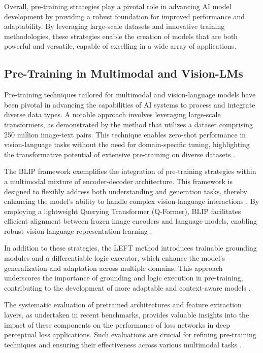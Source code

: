 Overall, pre-training strategies play a pivotal role in advancing AI model development by providing a robust foundation for improved performance and adaptability. By leveraging large-scale datasets and innovative training methodologies, these strategies enable the creation of models that are both powerful and versatile, capable of excelling in a wide array of applications.



\subsection{Pre-Training in Multimodal and Vision-LMs} \label{subsec:Pre-Training in Multimodal and Vision-LMs}

Pre-training techniques tailored for multimodal and vision-language models have been pivotal in advancing the capabilities of AI systems to process and integrate diverse data types. A notable approach involves leveraging large-scale transformers, as demonstrated by the method that utilizes a dataset comprising 250 million image-text pairs. This technique enables zero-shot performance in vision-language tasks without the need for domain-specific tuning, highlighting the transformative potential of extensive pre-training on diverse datasets \cite{ramesh2021zero}.



The BLIP framework exemplifies the integration of pre-training strategies within a multimodal mixture of encoder-decoder architecture. This framework is designed to flexibly address both understanding and generation tasks, thereby enhancing the model's ability to handle complex vision-language interactions \cite{BLIP:Boots7}. By employing a lightweight Querying Transformer (Q-Former), BLIP facilitates efficient alignment between frozen image encoders and language models, enabling robust vision-language representation learning \cite{li2023blip}.



In addition to these strategies, the LEFT method introduces trainable grounding modules and a differentiable logic executor, which enhance the model's generalization and adaptation across multiple domains. This approach underscores the importance of grounding and logic execution in pre-training, contributing to the development of more adaptable and context-aware models \cite{hsu2023whatsleftconceptgrounding}.



The systematic evaluation of pretrained architectures and feature extraction layers, as undertaken in recent benchmarks, provides valuable insights into the impact of these components on the performance of loss networks in deep perceptual loss applications. Such evaluations are crucial for refining pre-training techniques and ensuring their effectiveness across various multimodal tasks \cite{pihlgren2024systematicperformanceanalysisdeep}.



